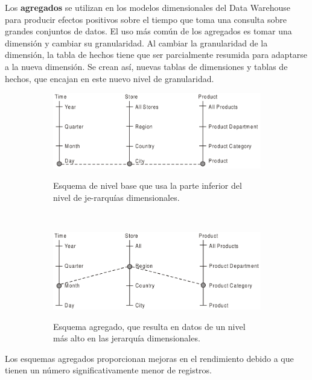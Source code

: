 \documentclass{fancyslides}
\begin{document}
\begin{frame}
\end{frame}

\begin{frame}
\misc
{
Los \textbf{agregados} se utilizan en los modelos dimensionales del Data Warehouse para producir efectos positivos sobre el tiempo que toma una consulta sobre grandes conjuntos de datos. El uso más común de los agregados es tomar una dimensión y cambiar su granularidad.
Al cambiar la granularidad de la dimensión, la tabla de hechos tiene que ser parcialmente resumida para adaptarse a la nueva dimensión. Se crean así, nuevas tablas de dimensiones y tablas de hechos, que encajan en este nuevo nivel de granularidad.
}
\end{frame}

\begin{frame}
\misc
{
\begin{figure}
        \centering
        \begin{subfigure}[b]{0.5\textwidth}
                \includegraphics[width=\textwidth]{ej1_agregados}

                Esquema de nivel base que usa la parte inferior del nivel de je-rarquías dimensionales.
        \end{subfigure}%
        ~ \quad
        \begin{subfigure}[b]{0.5\textwidth}
                \includegraphics[width=\textwidth]{ej2_agregados}
                
                Esquema agregado, que resulta en datos de un nivel más alto en las jerarquía dimensionales.
        \end{subfigure}
\end{figure}

Los esquemas agregados proporcionan mejoras en el rendimiento debido a que tienen un número significativamente menor de registros.

}
\end{frame}
\end{document}
